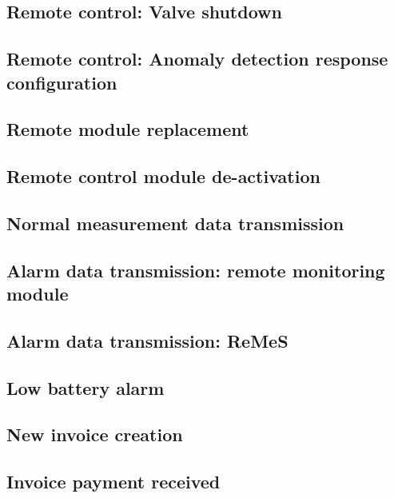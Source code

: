 \subsection{Remote control: Valve shutdown}
\label{uc-remote-control-valve-shutdown}


\subsection{Remote control: Anomaly detection response configuration}
\label{uc-remote-control-anomaly-detection-response-config}


\subsection{Remote module replacement}
\label{uc-remote-module-replacement}


\subsection{Remote control module de-activation}
\label{uc-remote-module-deactivation}


\subsection{Normal measurement data transmission}
\label{uc-normal-measurement}


\subsection{Alarm data transmission: remote monitoring module}
\label{uc-alarm-transmission-module}


\subsection{Alarm data transmission: ReMeS}
\label{uc-alarm-transmission-remes}


\subsection{Low battery alarm}
\label{uc-low-battery-alarm}


\subsection{New invoice creation}
\label{uc-new-bill-creation}


\subsection{Invoice payment received}
\label{uc-bill-payment-received}
